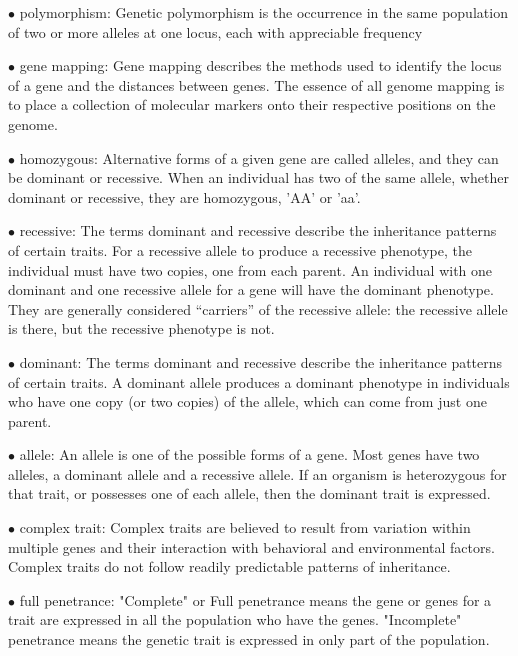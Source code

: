 \documentclass{article}
\begin{document}
\vspace{0.1in}
$\bullet$ polymorphism: 
Genetic polymorphism is the occurrence in the same population of two or more alleles at one locus, each with appreciable frequency


\vspace{0.1in}
$\bullet$ gene mapping: 
Gene mapping describes the methods used to identify the locus of a gene and the distances between genes. The essence of all genome mapping is to place a collection of molecular markers onto their respective positions on the genome. 


\vspace{0.1in}
$\bullet$ homozygous:
Alternative forms of a given gene are called alleles, and they can be dominant or recessive. When an individual has two of the same allele, whether dominant or recessive, they are homozygous, 'AA' or 'aa'.


\vspace{0.1in}
$\bullet$ recessive:
 The terms dominant and recessive describe the inheritance patterns of certain traits. For a recessive allele to produce a recessive phenotype, the individual must have two copies, one from each parent. An individual with one dominant and one recessive allele for a gene will have the dominant phenotype. They are generally considered “carriers” of the recessive allele: the recessive allele is there, but the recessive phenotype is not.


\vspace{0.1in}
$\bullet$ dominant:
The terms dominant and recessive describe the inheritance patterns of certain traits. A dominant allele produces a dominant phenotype in individuals who have one copy (or two copies) of the allele, which can come from just one parent.


\vspace{0.1in}
$\bullet$ allele:
An allele is one of the possible forms of a gene. Most genes have two alleles, a dominant allele and a recessive allele. If an organism is heterozygous for that trait, or possesses one of each allele, then the dominant trait is expressed.


\vspace{0.1in}
$\bullet$ complex trait:
Complex traits are believed to result from variation within multiple genes and their interaction with behavioral and environmental factors. Complex traits do not follow readily predictable patterns of inheritance.


\vspace{0.1in}
$\bullet$ full penetrance:
 "Complete" or Full penetrance means the gene or genes for a trait are expressed in all the population who have the genes. "Incomplete" penetrance means the genetic trait is expressed in only part of the population.
\end{document}
